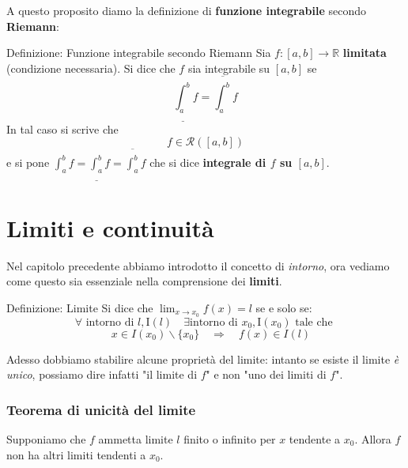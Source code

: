 \documentclass[x11names]{article}
\begin{document}
	A questo proposito diamo la definizione di \textbf{funzione integrabile} secondo \textbf{Riemann}:
		\begin{center}
		\colorbox{myblue}{\begin{minipage}{5.75in}
				\begin{blues}{Definizione: Funzione integrabile secondo Riemann}
					Sia $f:[a,b] \to \mathbb{R}$ \textbf{limitata} (condizione necessaria). Si dice che $f$ sia integrabile su $[a,b]$ se
					\[
					\underline{\int_{a}^{b}}f = \overline{\int_{a}^{b}}f 
					\]
					In tal caso si scrive che
					\[
					f \in \mathcal{R}\left(\left[a,b\right]\right)
					\]
					e si pone $\int_{a}^{b}f = \underline{\int_{a}^{b}}f = \overline{\int_{a}^{b}}f$ che si dice \textbf{integrale di $f$ su $[a,b]$}.
				\end{blues}
		\end{minipage}}       
	\end{center}
	
	\newpage
	\section{Limiti e continuità}
	Nel capitolo precedente abbiamo introdotto il concetto di \textit{intorno}, ora vediamo come questo sia essenziale nella comprensione dei \textbf{limiti}.
	
	
	\begin{center}
		\colorbox{myblue}{\begin{minipage}{5.75in}
				\begin{blues}{Definizione: Limite}
					Si dice che $\lim_{x\to x_0}f\left(x\right) = l$ se e solo se: 
					\[\forall \text{ intorno di } l, \text{I}\left(l\right) \quad \exists \text{intorno di } x_0, \text{I}\left(x_0\right) \text{ tale che }
					\]
					\[
					\quad x \in I\left(x_0\right) \backslash\{x_0\} \quad \Rightarrow \quad f\left(x\right) \in I\left(l\right)
					\]
				\end{blues}
		\end{minipage}}       
	\end{center}
	
	
	
	
	Adesso dobbiamo stabilire alcune proprietà del limite: intanto se esiste il limite \textit{è unico}, possiamo dire infatti "il limite di $f$" e non "uno dei limiti di $f$".
	
	\begin{center}
		\colorbox{myred}{\begin{minipage}{5.75in}
				\begin{redes}{}
					\subsubsection{Teorema di unicità del limite} Supponiamo che $f$ ammetta limite $l$ finito o infinito per $x$ tendente a $x_0$. Allora $f$ non ha altri limiti tendenti a $x_0$.
				\end{redes}
		\end{minipage}}        
	\end{center}
	
\end{document}
